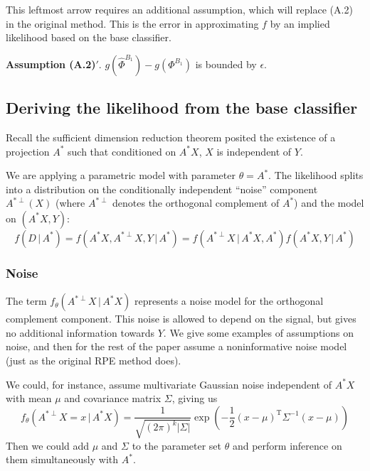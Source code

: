 \documentclass{amsart}
\begin{document}
This leftmost arrow requires an additional assumption, which will replace (A.2) in the original method. This is the error in approximating $f$ by an implied likelihood based on the base classifier.

\vspace{6pt}

\noindent \textbf{Assumption (A.2)$'$}. $g(\hat \Phi^{B_1}) - g(\Phi^{B_1})$ is bounded by $\epsilon$.

\subsection{Deriving the likelihood from the base classifier}

Recall the sufficient dimension reduction theorem posited the existence of a projection $A^*$ such that conditioned on $A^*X$, $X$ is independent of $Y$.

We are applying a parametric model with parameter $\theta=A^*$. The likelihood splits into a distribution on the conditionally independent ``noise'' component $A^{*\perp}(X)$ (where $A^{*\perp}$ denotes the orthogonal complement of $A^*$) and the model on $(A^*X,Y)$:
\begin{equation}
f(D\,|\,A^*)=f(A^* X, A^{*\perp} X,Y\,|\,A^*)=f(A^{*\perp} X\,|\,A^* X, A^*)f(A^* X, Y\,|\,A^*)
\label{eqn:likelihood-decomposition}
\end{equation}

\newcommand{\approxpropto}{\mathrel{\vcenter{
  \offinterlineskip\halign{\hfil$##$\cr
    \propto\cr\noalign{\kern2pt}\sim\cr\noalign{\kern-2pt}}}}}

\subsubsection{Noise}

The term $f_\theta(A^{*\perp} X\,|\,A^* X)$ represents a noise model for the orthogonal complement component. This noise is allowed to depend on the signal, but gives no additional information towards $Y$. We give some examples of assumptions on noise, and then for the rest of the paper assume a noninformative noise model (just as the original RPE method does).

We could, for instance, assume multivariate Gaussian noise independent of $A^*X$ with mean $\mu$ and covariance matrix $\Sigma$, giving us
\[
f_\theta(A^{*\perp} X = x \,|\,A^* X)=\frac{1}{\sqrt{(2\pi)^{k}|\Sigma|}}
\exp\left(-\frac{1}{2}({x}-{\mu})^\mathrm{T}{\Sigma}^{-1}({x}-{\mu})
\right)
\]
Then we could add $\mu$ and $\Sigma$ to the parameter set $\theta$ and perform inference on them simultaneously with $A^*$.
\end{document}
